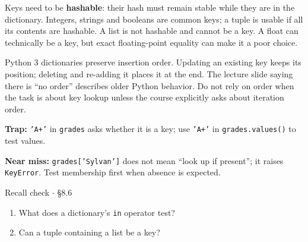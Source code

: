 \documentclass[11pt]{article}
\begin{document}
\begin{keepsection}
Keys need to be \textbf{hashable}: their hash must remain stable while they are in the dictionary. Integers, strings and booleans are common keys; a tuple is usable if all its contents are hashable. A list is not hashable and cannot be a key. A float can technically be a key, but exact floating-point equality can make it a poor choice.

Python 3 dictionaries preserve insertion order. Updating an existing key keeps its position; deleting and re-adding it places it at the end. The lecture slide saying there is “no order” describes older Python behavior. Do not rely on order when the task is about key lookup unless the course explicitly asks about iteration order.

\begin{notebox}\textbf{Trap:} \texttt{'A+'} in \texttt{grades} asks whether it is a key; use \texttt{'A+'} in \texttt{grades.values()} to test values.\end{notebox}

\begin{notebox}\textbf{Near miss:} \texttt{grades['Sylvan']} does not mean “look up if present”; it raises \texttt{KeyError}. Test membership first when absence is expected.\end{notebox}

\begin{recallbox}{Recall check \ensuremath{\cdot} §8.6}
\begin{enumerate}
\item What does a dictionary’s \texttt{in} operator test?
\item Can a tuple containing a list be a key?
\end{enumerate}

\end{recallbox}
\end{keepsection}
\end{document}
